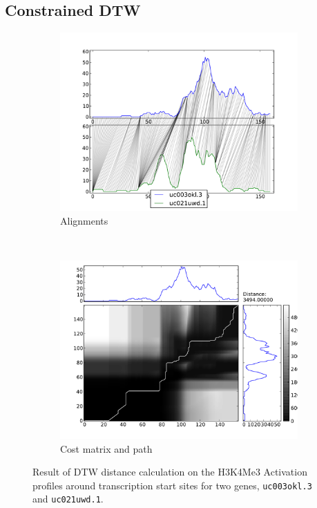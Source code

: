 \documentclass[parskip]{cs4rep}
\newcommand{\gene}[1]{{\tt #1}}
\newcommand{\histonemodification}[1]{#1}
\begin{document}
\subsection{Constrained DTW}

\begin{figure}
   \centering
   \begin{subfigure}[b]{0.45\textwidth}
       \centering
       \includegraphics[width=\textwidth]{figures/DTW/uc003okl_3-uc021uwd_1-mappings-std.pdf}
       \caption{Alignments}
       \label{fig:DTW:std:mappings}
   \end{subfigure}
   ~
   \begin{subfigure}[b]{0.45\textwidth}
       \centering
       \includegraphics[width=\textwidth]{figures/DTW/uc003okl_3-uc021uwd_1-cost-std.pdf}
       \caption{Cost matrix and path}
       \label{fig:DTW:std:cost}
   \end{subfigure}
   \caption{Result of DTW distance calculation on the \histonemodification{H3K4Me3} Activation profiles around transcription start sites for two genes,  \gene{uc003okl.3} and \gene{uc021uwd.1}.}
   \label{fig:DTW:std}
\end{figure}
\end{document}

